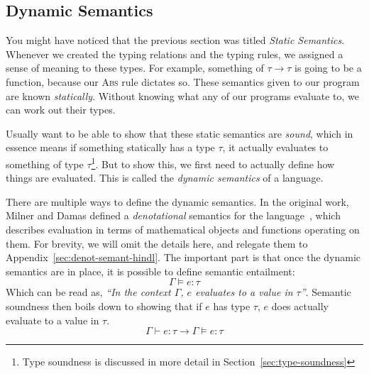 \subsection{Dynamic Semantics}

You might have noticed that the previous section was titled
\textit{Static Semantics}. Whenever we created the
typing relations and the typing rules, we assigned a sense of meaning
to these types. For example, something of $\tau \rightarrow \tau$ is going to be
a function, because our \textsc{Abs} rule dictates so. These semantics
given to our program are known \emph{statically}. Without knowing what
any of our programs evaluate to, we can work out their types.

Usually want to be able to show that these static semantics are
\emph{sound}, which in essence means if something statically has a
type $\tau$, it actually evaluates to something of type
$\tau$\footnote{Type soundness is discussed in more detail in
  Section~\ref{sec:type-soundness}}. But to show this, we first need
to actually define how things are evaluated. This is called the
\emph{dynamic semantics} of a language.

There are multiple ways to define the dynamic semantics. In the
original work, Milner and Damas defined a \emph{denotational}
semantics for the language~\cite{milner1978,damas1984}, which
describes evaluation in terms of mathematical objects and functions
operating on them. For brevity, we will omit the details here, and
relegate them to Appendix~\ref{sec:denot-semant-hindl}. The
important part is that once the dynamic semantics are in place, it is
possible to define semantic entailment:
\[ \Gamma \vDash e : \tau \]
Which can be read as, \textsl{``In the context $\Gamma$, $e$ evaluates to a
  value in $\tau$''}. Semantic soundness then boils down to showing that
if $e$ has type $\tau$, $e$ does actually evaluate to a value in $\tau$.
\[ \Gamma \vdash e : \tau \rightarrow \Gamma \vDash e : \tau \]


